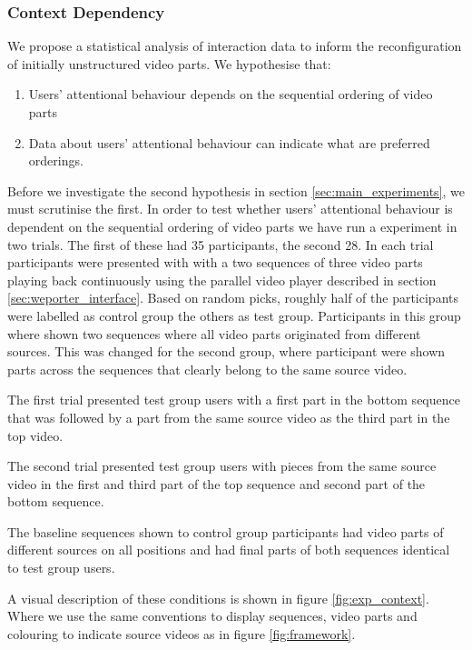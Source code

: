 \subsubsection{Context Dependency}
We propose a statistical analysis of interaction data to inform the reconfiguration of initially unstructured video parts. We hypothesise that:
\begin{enumerate}
  \item Users' attentional behaviour depends on the sequential ordering of video parts
  \item Data about users' attentional behaviour can indicate what are preferred orderings.
\end{enumerate}

Before we investigate the second hypothesis in section \ref{sec:main_experiments}, we must scrutinise the first. In order to test whether users' attentional behaviour is dependent on the sequential ordering of video parts we have run a experiment in two trials. The first of these had 35 participants, the second 28. In each trial participants were presented with with a two sequences of three video parts playing back continuously using the parallel video player described in section \ref{sec:weporter_interface}. Based on random picks, roughly half of the participants were labelled as control group the others as test group. Participants in this group where shown two sequences where all video parts originated from different sources. This was changed for the second group, where participant were shown parts across the sequences that clearly belong to the same source video. 

The first trial presented test group users with a first part in the bottom sequence that was followed by a part from the same source video as the third part in the top video.

The second trial presented test group users with pieces from the same source video in the first and third part of the top sequence and second part of the bottom sequence.

The baseline sequences shown to control group participants had video parts of different sources on all positions and had final parts of both sequences identical to test group users.

A visual description of these conditions is shown in figure \ref{fig:exp_context}. Where we use the same conventions to display sequences, video parts and colouring to indicate source videos as in figure \ref{fig:framework}.

